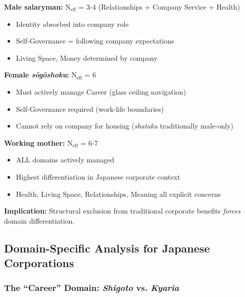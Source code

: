 \begin{tcolorbox}[colback=purple!5!white, colframe=purple!75!black, title=Finding: Women Show Higher Domain Differentiation Than Men]

\textbf{Male salaryman:} N$_{\text{eff}}$ = 3-4 (Relationships + Company Service + Health)
\begin{itemize}[nosep]
\item Identity absorbed into company role
\item Self-Governance = following company expectations
\item Living Space, Money determined by company
\end{itemize}

\textbf{Female \textit{sōgōshoku}:} N$_{\text{eff}}$ = 6
\begin{itemize}[nosep]
\item Must actively manage Career (glass ceiling navigation)
\item Self-Governance required (work-life boundaries)
\item Cannot rely on company for housing (\textit{shataku} traditionally male-only)
\end{itemize}

\textbf{Working mother:} N$_{\text{eff}}$ = 6-7
\begin{itemize}[nosep]
\item ALL domains actively managed
\item Highest differentiation in Japanese corporate context
\item Health, Living Space, Relationships, Meaning all explicit concerns
\end{itemize}

\textbf{Implication:} Structural exclusion from traditional corporate benefits \textit{forces} domain differentiation.

\end{tcolorbox}

\subsection{Domain-Specific Analysis for Japanese Corporations}

\subsubsection{The ``Career'' Domain: \textit{Shigoto} vs. \textit{Kyaria}}

